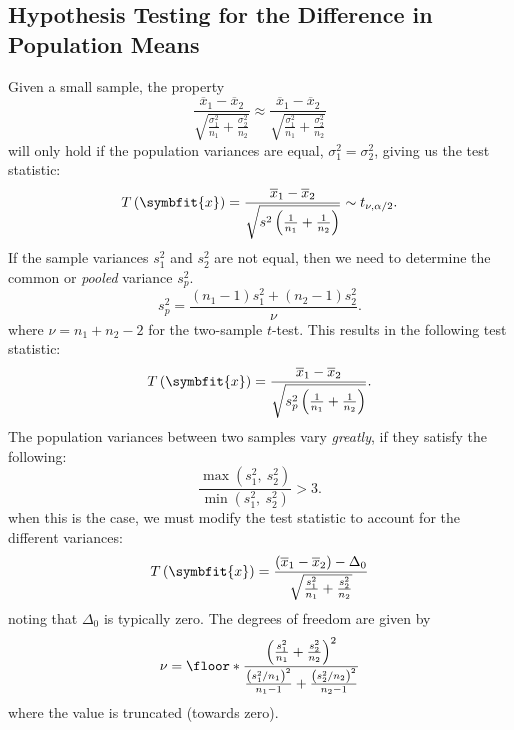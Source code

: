 \documentclass{article}
\begin{document}
\subsection{Hypothesis Testing for the Difference in Population Means}
Given a small sample, the property
\begin{equation*}
    \frac{\overline{x}_1 - \overline{x}_2}{\sqrt{\frac{\sigma_1^2}{n_1} + \frac{\sigma_2^2}{n_2}}} \approx \frac{\overline{x}_1 - \overline{x}_2}{\sqrt{\frac{\sigma_1^2}{n_1} + \frac{\sigma_2^2}{n_2}}}
\end{equation*}
will only hold if the population variances are equal, \(\sigma_1^2 = \sigma_2^2\), giving
us the test statistic:
\begin{equation*}
    T\left( \symbfit{x} \right) = \frac{\overline{x}_1 - \overline{x}_2}{\sqrt{s^2\left( \frac{1}{n_1} + \frac{1}{n_2} \right)}} \sim t_{\nu, \alpha/2}.
\end{equation*}
If the sample variances \(s_1^2\) and \(s_2^2\) are not equal, then we
need to determine the common or \textit{pooled} variance \(s_p^2\).
\begin{equation*}
    s_p^2 = \frac{\left( n_1 - 1 \right)s_1^2 + \left( n_2 - 1 \right)s_2^2}{\nu}.
\end{equation*}
where \(\nu = n_1 + n_2 - 2\) for the two-sample \(t\)-test.
This results in the following test statistic:
\begin{equation*}
    T\left( \symbfit{x} \right) = \frac{\overline{x}_1 - \overline{x}_2}{\sqrt{s_p^2 \left( \frac{1}{n_1} + \frac{1}{n_2} \right)}}.
\end{equation*}
The population variances between two samples vary \textit{greatly}, if
they satisfy the following:
\begin{equation*}
    \frac{\max{\left( s_1^2,\: s_2^2 \right)}}{\min{\left( s_1^2,\: s_2^2 \right)}} > 3.
\end{equation*}
when this is the case, we must modify the test statistic to account for the
different variances:
\begin{equation*}
    T\left( \symbfit{x} \right) = \frac{\left( \overline{x}_1 - \overline{x}_2 \right) - \Delta_0}{\sqrt{\frac{s_1^2}{n_1} + \frac{s_2^2}{n_2}}}
\end{equation*}
noting that \(\Delta_0\) is typically zero. The degrees of freedom are given by
\begin{equation*}
    \nu = \floor*{\frac{\left( \frac{s_1^2}{n_1} + \frac{s_2^2}{n_2} \right)^2}{\frac{\left( s_1^2 / n_1 \right)^2}{n_1 - 1} + \frac{\left( s_2^2 / n_2 \right)^2}{n_2 - 1}}}
\end{equation*}
where the value is truncated (towards zero).
\end{document}
